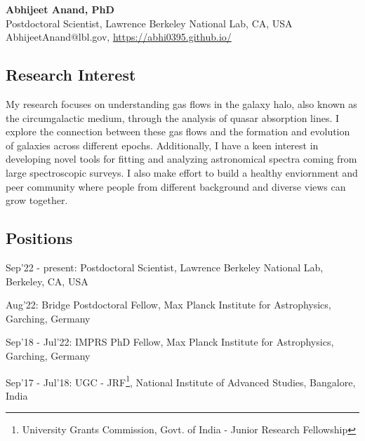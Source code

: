 \documentclass[12pt,letterpaper]{article}
\begin{document}
\thispagestyle{empty}\sloppy\sloppypar\raggedbottom

\textbf{\Large Abhijeet Anand, PhD}\\[0.5ex]
Postdoctoral Scientist, Lawrence Berkeley National Lab, CA, USA\\[0.5ex]
\textsf{\small AbhijeetAnand@lbl.gov, \href{https://abhi0395.github.io/}{https://abhi0395.github.io/}}\\[0.5ex]

\subsection{Research Interest}
My research focuses on understanding gas flows in the galaxy halo, also known as the circumgalactic medium, through the analysis of quasar absorption lines. I explore the connection between these gas flows and the formation and evolution of galaxies across different epochs. Additionally, I have a keen interest in developing novel tools for fitting and analyzing astronomical spectra coming from large spectroscopic surveys. I also make effort to build a healthy enviornment and peer community where people from different background and diverse views can grow together.

\subsection{Positions}
\begin{list}{}{\cvlist}
\item Sep'22 - present: Postdoctoral Scientist, Lawrence Berkeley National Lab, Berkeley, CA, USA \\
\item Aug'22: Bridge Postdoctoral Fellow, Max Planck Institute for Astrophysics, Garching, Germany
\item Sep'18 - Jul'22: IMPRS PhD Fellow, Max Planck Institute for Astrophysics, Garching, Germany
\item Sep'17 - Jul'18: UGC - JRF\footnote{University Grants Commission, Govt. of India - Junior Research Fellowship}, National Institute of Advanced Studies, Bangalore, India 
\end{list}
\end{document}
